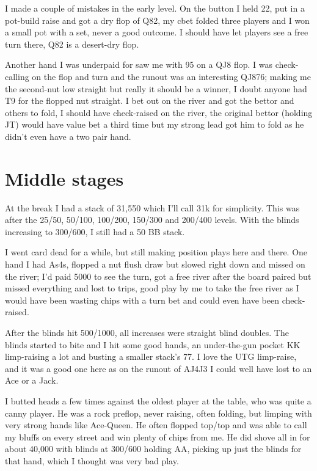 I made a couple of mistakes in the early level. On the button I held
22, put in a pot-build raise and got a dry flop of Q82, my cbet
folded three players and I won a small pot with a set, never a
good outcome. I should have let players see a free turn there, Q82
is a desert-dry flop.

Another hand I was underpaid for saw me with 95 on a QJ8 flop. I was
check-calling on the flop and turn and the runout was an interesting
QJ876; making me the second-nut low straight but really it
should be a winner, I doubt anyone had T9 for the flopped nut straight.
I bet out on the river and got the bettor and others to fold, I should
have check-raised on the river, the original bettor (holding JT)
would have value bet a third time but my strong lead got him to fold
as he didn't even have a two pair hand.

\section{Middle stages}

At the break I had a stack of 31,550 which I'll call 31k for simplicity.
This was after the 25/50, 50/100, 100/200, 150/300 and 200/400 levels.
With the blinds increasing to 300/600, I still had a 50 BB stack.

I went card dead for a while, but still making position plays here
and there. One hand I had As4s, flopped a nut flush draw but slowed
right down and missed on the river; I'd paid 5000 to see the turn,
got a free river after the board paired but missed everything and
lost to trips, good play by me to take the free river as I would
have been wasting chips with a turn bet and could even have been
check-raised.

After the blinds hit 500/1000, all increases were straight blind doubles.
The blinds started to bite and I hit some good hands, an under-the-gun
pocket KK limp-raising a lot and busting a smaller stack's 77. I love
the UTG limp-raise, and it was a good one here as on the runout of
AJ4J3 I could well have lost to an Ace or a Jack.

I butted heads a few times against the oldest player at the table,
who was quite a canny player. He was a rock preflop, never raising,
often folding, but limping with very strong hands like Ace-Queen.
He often flopped top/top and was able to call my bluffs on every
street and win plenty of chips from me. He did shove all in for
about 40,000 with blinds at 300/600 holding AA, picking up just
the blinds for that hand, which I thought was very bad play.


